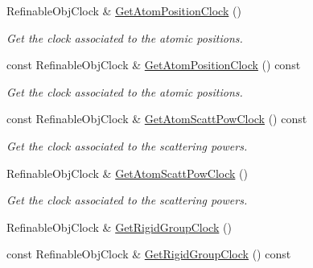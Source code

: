 \begin{DoxyCompactItemize}
\mbox{\label{class_obj_cryst_1_1_molecule_ae354857ac578a8b27d67b689772326e5}} 
Refinable\+Obj\+Clock \& \mbox{\hyperlink{class_obj_cryst_1_1_molecule_ae354857ac578a8b27d67b689772326e5}{Get\+Atom\+Position\+Clock}} ()
\begin{DoxyCompactList}\small\item\em Get the clock associated to the atomic positions. \end{DoxyCompactList}\item 
\mbox{\label{class_obj_cryst_1_1_molecule_aff4bd9780415632f2095e3b8a4cf65b9}} 
const Refinable\+Obj\+Clock \& \mbox{\hyperlink{class_obj_cryst_1_1_molecule_aff4bd9780415632f2095e3b8a4cf65b9}{Get\+Atom\+Position\+Clock}} () const
\begin{DoxyCompactList}\small\item\em Get the clock associated to the atomic positions. \end{DoxyCompactList}\item 
\mbox{\label{class_obj_cryst_1_1_molecule_a858808c8f9a4c71fe30d44217bc5971e}} 
const Refinable\+Obj\+Clock \& \mbox{\hyperlink{class_obj_cryst_1_1_molecule_a858808c8f9a4c71fe30d44217bc5971e}{Get\+Atom\+Scatt\+Pow\+Clock}} () const
\begin{DoxyCompactList}\small\item\em Get the clock associated to the scattering powers. \end{DoxyCompactList}\item 
\mbox{\label{class_obj_cryst_1_1_molecule_a50d861909f252194b946d12bbc0ce1d8}} 
Refinable\+Obj\+Clock \& \mbox{\hyperlink{class_obj_cryst_1_1_molecule_a50d861909f252194b946d12bbc0ce1d8}{Get\+Atom\+Scatt\+Pow\+Clock}} ()
\begin{DoxyCompactList}\small\item\em Get the clock associated to the scattering powers. \end{DoxyCompactList}\item 
Refinable\+Obj\+Clock \& \mbox{\hyperlink{class_obj_cryst_1_1_molecule_a6f7aea0410adabd5e0159d082feefe72}{Get\+Rigid\+Group\+Clock}} ()
\item 
const Refinable\+Obj\+Clock \& \mbox{\hyperlink{class_obj_cryst_1_1_molecule_a32b58e8e7ed93cf444f36f72cb6607a3}{Get\+Rigid\+Group\+Clock}} () const

\end{DoxyCompactItemize}
